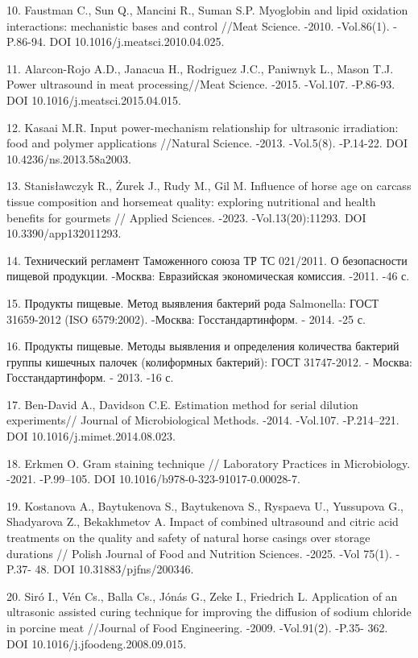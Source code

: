 \begin{refs}
10. Faustman C., Sun Q., Mancini R., Suman S.P. Myoglobin and lipid
oxidation interactions: mechanistic bases and control //Meat Science.
-2010. -Vol.86(1). -P.86-94. DOI 10.1016/j.meatsci.2010.04.025.

11. Alarcon-Rojo A.D., Janacua H., Rodriguez J.C., Paniwnyk L., Mason T.J.
Power ultrasound in meat processing//Meat Science. -2015. -Vol.107.
-P.86-93. DOI 10.1016/j.meatsci.2015.04.015.

12. Kasaai M.R. Input power-mechanism relationship for ultrasonic
irradiation: food and polymer applications //Natural Science. -2013.
-Vol.5(8). -P.14-22. DOI 10.4236/ns.2013.58a2003.

13. Stanisławczyk R., Żurek J., Rudy M., Gil M. Influence of horse age on
carcass tissue composition and horsemeat quality: exploring
nutritional and health benefits for gourmets // Applied Sciences.
-2023. -Vol.13(20):11293. DOI 10.3390/app132011293.

14. Технический регламент Таможенного союза ТР ТС 021/2011. О безопасности
пищевой продукции. -Москва: Евразийская экономическая комиссия. -2011.
-46 с.

15. Продукты пищевые. Метод выявления бактерий рода Salmonella: ГОСТ
31659-2012 (ISO 6579:2002). -Москва: Госстандартинформ. - 2014. -25 с.

16. Продукты пищевые. Методы выявления и определения количества бактерий
группы кишечных палочек (колиформных бактерий): ГОСТ 31747-2012. -
Москва: Госстандартинформ. - 2013. -16 с.

17. Ben-David A., Davidson C.E. Estimation method for serial dilution
experiments// Journal of Microbiological Methods. -2014. -Vol.107.
-P.214--221. DOI 10.1016/j.mimet.2014.08.023.

18. Erkmen O. Gram staining technique // Laboratory Practices in
Microbiology. -2021. -P.99--105. DOI
10.1016/b978-0-323-91017-0.00028-7.

19. Kostanova A., Baytukenova S., Baytukenova S., Ryspaeva U., Yussupova
G., Shadyarova Z., Bekakhmetov A. Impact of combined ultrasound and
citric acid treatments on the quality and safety of natural horse
casings over storage durations // Polish Journal of Food and Nutrition
Sciences. -2025. -Vol 75(1). -P.37- 48. DOI 10.31883/pjfns/200346.

20. Siró I., Vén Cs., Balla Cs., Jónás G., Zeke I., Friedrich L.
Application of an ultrasonic assisted curing technique for improving
the diffusion of sodium chloride in porcine meat //Journal of Food
Engineering. -2009. -Vol.91(2). -P.35- 362. DOI
10.1016/j.jfoodeng.2008.09.015.
\end{refs}


